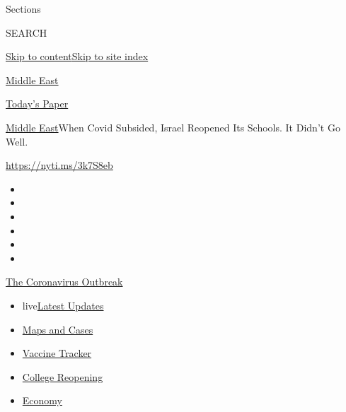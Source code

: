 Sections

SEARCH

\protect\hyperlink{site-content}{Skip to
content}\protect\hyperlink{site-index}{Skip to site index}

\href{https://www.nytimes3xbfgragh.onion/section/world/middleeast}{Middle
East}

\href{https://myaccount.nytimes3xbfgragh.onion/auth/login?response_type=cookie\&client_id=vi}{}

\href{https://www.nytimes3xbfgragh.onion/section/todayspaper}{Today's
Paper}

\href{/section/world/middleeast}{Middle East}\textbar{}When Covid
Subsided, Israel Reopened Its Schools. It Didn't Go Well.

\url{https://nyti.ms/3k7S8eb}

\begin{itemize}
\item
\item
\item
\item
\item
\item
\end{itemize}

\href{https://www.nytimes3xbfgragh.onion/news-event/coronavirus?action=click\&pgtype=Article\&state=default\&region=TOP_BANNER\&context=storylines_menu}{The
Coronavirus Outbreak}

\begin{itemize}
\tightlist
\item
  live\href{https://www.nytimes3xbfgragh.onion/2020/08/04/world/coronavirus-cases.html?action=click\&pgtype=Article\&state=default\&region=TOP_BANNER\&context=storylines_menu}{Latest
  Updates}
\item
  \href{https://www.nytimes3xbfgragh.onion/interactive/2020/us/coronavirus-us-cases.html?action=click\&pgtype=Article\&state=default\&region=TOP_BANNER\&context=storylines_menu}{Maps
  and Cases}
\item
  \href{https://www.nytimes3xbfgragh.onion/interactive/2020/science/coronavirus-vaccine-tracker.html?action=click\&pgtype=Article\&state=default\&region=TOP_BANNER\&context=storylines_menu}{Vaccine
  Tracker}
\item
  \href{https://www.nytimes3xbfgragh.onion/2020/08/02/us/covid-college-reopening.html?action=click\&pgtype=Article\&state=default\&region=TOP_BANNER\&context=storylines_menu}{College
  Reopening}
\item
  \href{https://www.nytimes3xbfgragh.onion/live/2020/08/04/business/stock-market-today-coronavirus?action=click\&pgtype=Article\&state=default\&region=TOP_BANNER\&context=storylines_menu}{Economy}
\end{itemize}

